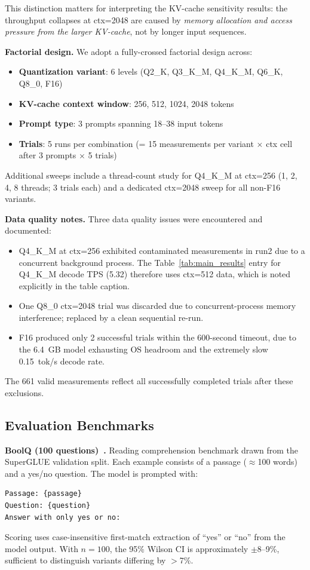 \documentclass[conference]{IEEEtran}
\begin{document}
This distinction matters for interpreting the KV-cache sensitivity results:
the throughput collapses at ctx=2048 are caused by \emph{memory allocation and
access pressure from the larger KV-cache}, not by longer input sequences.

\textbf{Factorial design.}
We adopt a fully-crossed factorial design across:
\begin{itemize}
  \item \textbf{Quantization variant}: 6 levels (Q2\_K, Q3\_K\_M, Q4\_K\_M,
        Q6\_K, Q8\_0, F16)
  \item \textbf{KV-cache context window}: 256, 512, 1024, 2048 tokens
  \item \textbf{Prompt type}: 3 prompts spanning 18--38 input tokens
  \item \textbf{Trials}: 5 runs per combination (= 15 measurements per
        variant $\times$ ctx cell after 3 prompts $\times$ 5 trials)
\end{itemize}

Additional sweeps include a thread-count study for Q4\_K\_M at ctx=256
(1, 2, 4, 8 threads; 3 trials each) and a dedicated ctx=2048 sweep for all
non-F16 variants.

\textbf{Data quality notes.}
Three data quality issues were encountered and documented:
\begin{itemize}
  \item Q4\_K\_M at ctx=256 exhibited contaminated measurements in run2 due to
        a concurrent background process. The Table~\ref{tab:main_results} entry
        for Q4\_K\_M decode TPS (5.32) therefore uses ctx=512 data, which is
        noted explicitly in the table caption.
  \item One Q8\_0 ctx=2048 trial was discarded due to concurrent-process memory
        interference; replaced by a clean sequential re-run.
  \item F16 produced only 2 successful trials within the 600-second timeout,
        due to the 6.4~GB model exhausting OS headroom and the extremely slow
        0.15~tok/s decode rate.
\end{itemize}

The 661 valid measurements reflect all successfully completed trials after
these exclusions.

\subsection{Evaluation Benchmarks}

\textbf{BoolQ (100 questions)~\cite{boolq}.}
Reading comprehension benchmark drawn from the SuperGLUE validation split.
Each example consists of a passage (${\approx}$100 words) and a yes/no question.
The model is prompted with:
\begin{verbatim}
Passage: {passage}
Question: {question}
Answer with only yes or no:
\end{verbatim}
Scoring uses case-insensitive first-match extraction of ``yes'' or ``no''
from the model output. With $n{=}100$, the 95\% Wilson CI is approximately
$\pm$8--9\%, sufficient to distinguish variants differing by $>$7\%.
\end{document}
